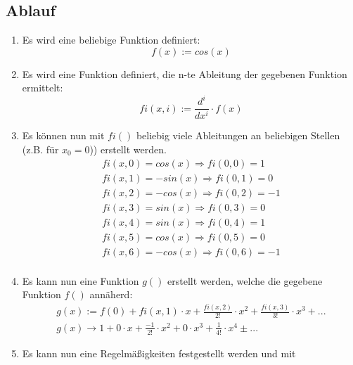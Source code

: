 \documentclass[a4paper,10pt]{article}
\begin{document}
\subsection{Ablauf}
\begin{enumerate}
\item { Es wird eine beliebige Funktion definiert:
    \begin{equation}
      \label{eq:1}
      f(x) := cos(x)
    \end{equation}
  }
\item { Es wird eine Funktion definiert, die n-te Ableitung der
    gegebenen Funktion ermittelt:
    \begin{equation}
      \label{eq:3}
      fi(x,i) := \frac{d^i}{dx^i} \cdot f(x)
    \end{equation}
  }
\item { Es können nun mit $ fi() $ beliebig viele Ableitungen an
    beliebigen Stellen (z.B. für $ x_0 = 0 $)) erstellt werden.
    \begin{equation}
      \label{eq:4}
      \begin{split}
        fi(x,0) = cos(x)  \Rightarrow fi(0,0) = 1\\
        fi(x,1) = -sin(x) \Rightarrow fi(0,1) = 0\\
        fi(x,2) = -cos(x) \Rightarrow fi(0,2) = -1\\
        fi(x,3) = sin(x)  \Rightarrow fi(0,3) = 0\\
        fi(x,4) = sin(x)  \Rightarrow fi(0,4) = 1\\
        fi(x,5) = cos(x)  \Rightarrow fi(0,5) = 0\\
        fi(x,6) = -cos(x) \Rightarrow fi(0,6) = -1\\
      \end{split}
    \end{equation}
  }
\item { Es kann nun eine Funktion $ g() $ erstellt werden, welche die
    gegebene Funktion $ f() $ annäherd:
    \begin{equation}
      \label{eq:10}
      \begin{split}
        g(x) := f(0) + fi(x,1) \cdot x + \frac{fi(x, 2)}{2!} \cdot x^2 + \frac{fi(x, 3)}{3!} \cdot x^3 + ...\\
        g(x) \rightarrow 1 + 0 \cdot x + \frac{-1}{2!} \cdot x^2 + 0 \cdot x^3 + \frac{1}{4!} \cdot x^4 \pm ...
      \end{split}
    \end{equation}
  }
\item { Es kann nun eine Regelmäßigkeiten festgestellt werden und mit
}
\end{enumerate}
\end{document}
